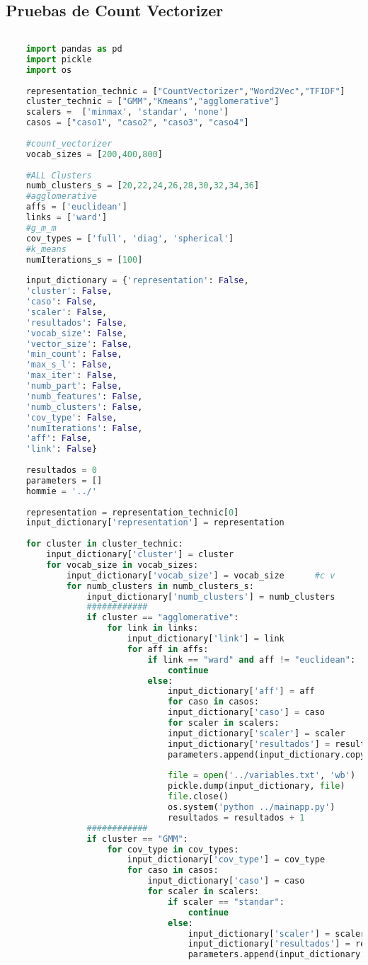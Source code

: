 \documentclass[12pt]{article}
\begin{document}
	\subsection{Pruebas de Count Vectorizer}	
	\begin{lstlisting}[language=Python, 
	caption = Rutina de pruebas CountVectorizer,
	label={lst:pruebasCoVe}]
	
	import pandas as pd
	import pickle
	import os
	
	representation_technic = ["CountVectorizer","Word2Vec","TFIDF"]
	cluster_technic = ["GMM","Kmeans","agglomerative"]
	scalers =  ['minmax', 'standar', 'none']
	casos = ["caso1", "caso2", "caso3", "caso4"]
	
	#count_vectorizer
	vocab_sizes = [200,400,800]
	
	#ALL Clusters
	numb_clusters_s = [20,22,24,26,28,30,32,34,36]
	#agglomerative
	affs = ['euclidean']
	links = ['ward']
	#g_m_m
	cov_types = ['full', 'diag', 'spherical']
	#k_means
	numIterations_s = [100]
	
	input_dictionary = {'representation': False,
	'cluster': False,
	'caso': False,
	'scaler': False,
	'resultados': False,
	'vocab_size': False,
	'vector_size': False,
	'min_count': False,
	'max_s_l': False,
	'max_iter': False,
	'numb_part': False,
	'numb_features': False,
	'numb_clusters': False,
	'cov_type': False,
	'numIterations': False,
	'aff': False,
	'link': False}
	
	resultados = 0
	parameters = []
	hommie = '../'
	
	representation = representation_technic[0]
	input_dictionary['representation'] = representation
	
	for cluster in cluster_technic:
		input_dictionary['cluster'] = cluster
		for vocab_size in vocab_sizes:
			input_dictionary['vocab_size'] = vocab_size      #c v
			for numb_clusters in numb_clusters_s:
				input_dictionary['numb_clusters'] = numb_clusters
				############
				if cluster == "agglomerative":
					for link in links:
						input_dictionary['link'] = link
						for aff in affs:
							if link == "ward" and aff != "euclidean":
								continue
							else:
								input_dictionary['aff'] = aff                
								for caso in casos:
								input_dictionary['caso'] = caso
								for scaler in scalers:
								input_dictionary['scaler'] = scaler
								input_dictionary['resultados'] = resultados    
								parameters.append(input_dictionary.copy())                            
							
								file = open('../variables.txt', 'wb')
								pickle.dump(input_dictionary, file)
								file.close()
								os.system('python ../mainapp.py')
								resultados = resultados + 1 
				############
				if cluster == "GMM":
					for cov_type in cov_types:
						input_dictionary['cov_type'] = cov_type             
						for caso in casos:
							input_dictionary['caso'] = caso
							for scaler in scalers:
								if scaler == "standar":
									continue
								else:
									input_dictionary['scaler'] = scaler
									input_dictionary['resultados'] = resultados  
									parameters.append(input_dictionary.copy())     
					

\end{lstlisting}
\end{document}
